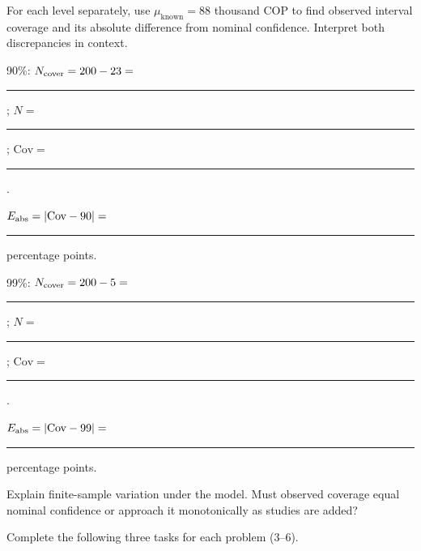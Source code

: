 \par\smallskip
\noindent\begin{minipage}[t]{.49\linewidth}
\vspace{0pt}
\end{minipage}\hfill
\begin{minipage}[t]{.49\linewidth}
\vspace{0pt}
\end{minipage}\par

\par For each level separately, use $\mu_{\mathrm{known}}=88$ thousand COP to find observed interval coverage and its absolute difference from nominal confidence. Interpret both discrepancies in context.
\par\noindent\begin{minipage}[t]{0.70\linewidth}
\vspace{0pt}
\par 90\%: $N_{\rm cover}=200-23=$ \rule{.5in}{.3pt}; $N=$ \rule{.4in}{.3pt}; $\mathrm{Cov}=$ \rule{1in}{.3pt}.
\par $E_{\rm abs}=|\mathrm{Cov}-90|=$ \rule{.7in}{.3pt} percentage points. 
\par 99\%: $N_{\rm cover}=200-5=$ \rule{.5in}{.3pt}; $N=$ \rule{.4in}{.3pt}; $\mathrm{Cov}=$ \rule{1in}{.3pt}.
\par $E_{\rm abs}=|\mathrm{Cov}-99|=$ \rule{.7in}{.3pt} percentage points. 
\end{minipage}\hfill
\begin{minipage}[t]{0.28\linewidth}
\vspace{0pt}
\par Explain finite-sample variation under the model. Must observed coverage equal nominal confidence or approach it monotonically as studies are added?
\end{minipage}\par


\clearpage
{}
Complete the following three tasks for each problem (3--6).



